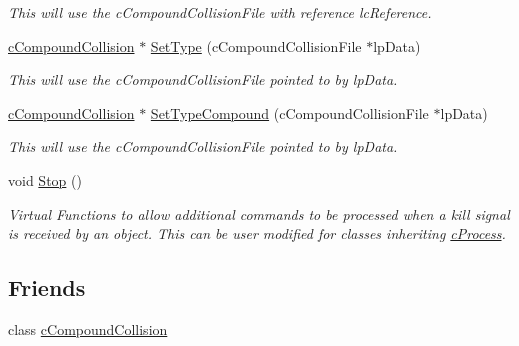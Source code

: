 \begin{DoxyCompactItemize}
\begin{DoxyCompactList}\small\item\em This will use the cCompoundCollisionFile with reference lcReference. \end{DoxyCompactList}\item 
\hypertarget{classc_collision_object_a3621925675923227a484860b5c38f017}{
\hyperlink{classc_compound_collision}{cCompoundCollision} $\ast$ \hyperlink{classc_collision_object_a3621925675923227a484860b5c38f017}{SetType} (cCompoundCollisionFile $\ast$lpData)}
\label{classc_collision_object_a3621925675923227a484860b5c38f017}

\begin{DoxyCompactList}\small\item\em This will use the cCompoundCollisionFile pointed to by lpData. \end{DoxyCompactList}\item 
\hypertarget{classc_collision_object_a2ef3e85552221a2a33356e6f36cfe070}{
\hyperlink{classc_compound_collision}{cCompoundCollision} $\ast$ \hyperlink{classc_collision_object_a2ef3e85552221a2a33356e6f36cfe070}{SetTypeCompound} (cCompoundCollisionFile $\ast$lpData)}
\label{classc_collision_object_a2ef3e85552221a2a33356e6f36cfe070}

\begin{DoxyCompactList}\small\item\em This will use the cCompoundCollisionFile pointed to by lpData. \end{DoxyCompactList}\item 
\hypertarget{classc_collision_object_a0d785a464cb0c6ca7e43dd79ce167473}{
void \hyperlink{classc_collision_object_a0d785a464cb0c6ca7e43dd79ce167473}{Stop} ()}
\label{classc_collision_object_a0d785a464cb0c6ca7e43dd79ce167473}

\begin{DoxyCompactList}\small\item\em Virtual Functions to allow additional commands to be processed when a kill signal is received by an object. This can be user modified for classes inheriting \hyperlink{classc_process}{cProcess}. \end{DoxyCompactList}\end{DoxyCompactItemize}
\subsection*{Friends}
\begin{DoxyCompactItemize}
\item 
\hypertarget{classc_collision_object_adac1704bd2ebfcd3d16228685997db63}{
class \hyperlink{classc_collision_object_adac1704bd2ebfcd3d16228685997db63}{cCompoundCollision}}
\label{classc_collision_object_adac1704bd2ebfcd3d16228685997db63}

\end{DoxyCompactItemize}


